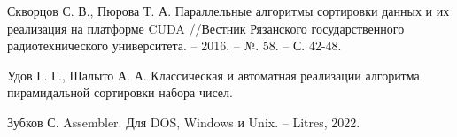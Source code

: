 \renewcommand{\bibname}{Список использованных источников}
\begin{thebibliography}{100}

Скворцов С. В., Пюрова Т. А. Параллельные алгоритмы сортировки данных и их реализация на платформе CUDA //Вестник Рязанского государственного радиотехнического университета. – 2016. – №. 58. – С. 42-48.

Удов Г. Г., Шалыто А. А. Классическая и автоматная реализации алгоритма пирамидальной сортировки набора чисел.

Зубков С. Assembler. Для DOS, Windows и Unix. – Litres, 2022.






\end{thebibliography}

\newpage